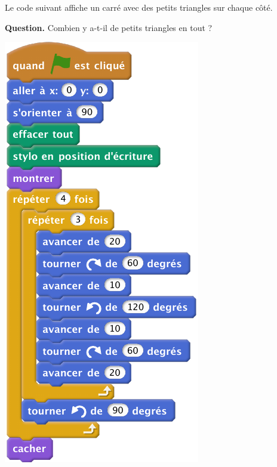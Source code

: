 \documentclass[class=report,crop=false, 12pt]{standalone}
\begin{document}
\begin{enigme}
Le code suivant affiche un carré avec des petits triangles sur chaque côté. 

\bigskip

\textbf{Question.} Combien y a-t-il de petits triangles en tout ? 

\bigskip

\begin{center}
  \includegraphics[scale=\scalebloc]{code-02-eg3}
\end{center} 


\end{enigme}
\end{document}
